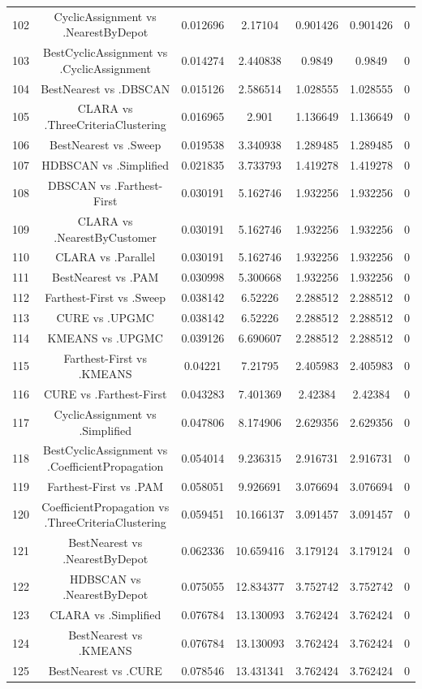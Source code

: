 \documentclass[a4paper,10pt]{article}
\begin{document}
\begin{landscape}
\begin{table}[!htp]
\begin{tabular}{ccccccc}
102&CyclicAssignment vs .NearestByDepot&0.012696&2.17104&0.901426&0.901426&0\\
103&BestCyclicAssignment vs .CyclicAssignment&0.014274&2.440838&0.9849&0.9849&0\\
104&BestNearest vs .DBSCAN&0.015126&2.586514&1.028555&1.028555&0\\
105&CLARA vs .ThreeCriteriaClustering&0.016965&2.901&1.136649&1.136649&0\\
106&BestNearest vs .Sweep&0.019538&3.340938&1.289485&1.289485&0\\
107&HDBSCAN vs .Simplified&0.021835&3.733793&1.419278&1.419278&0\\
108&DBSCAN vs .Farthest-First&0.030191&5.162746&1.932256&1.932256&0\\
109&CLARA vs .NearestByCustomer&0.030191&5.162746&1.932256&1.932256&0\\
110&CLARA vs .Parallel&0.030191&5.162746&1.932256&1.932256&0\\
111&BestNearest vs .PAM&0.030998&5.300668&1.932256&1.932256&0\\
112&Farthest-First vs .Sweep&0.038142&6.52226&2.288512&2.288512&0\\
113&CURE vs .UPGMC&0.038142&6.52226&2.288512&2.288512&0\\
114&KMEANS vs .UPGMC&0.039126&6.690607&2.288512&2.288512&0\\
115&Farthest-First vs .KMEANS&0.04221&7.21795&2.405983&2.405983&0\\
116&CURE vs .Farthest-First&0.043283&7.401369&2.42384&2.42384&0\\
117&CyclicAssignment vs .Simplified&0.047806&8.174906&2.629356&2.629356&0\\
118&BestCyclicAssignment vs .CoefficientPropagation&0.054014&9.236315&2.916731&2.916731&0\\
119&Farthest-First vs .PAM&0.058051&9.926691&3.076694&3.076694&0\\
120&CoefficientPropagation vs .ThreeCriteriaClustering&0.059451&10.166137&3.091457&3.091457&0\\
121&BestNearest vs .NearestByDepot&0.062336&10.659416&3.179124&3.179124&0\\
122&HDBSCAN vs .NearestByDepot&0.075055&12.834377&3.752742&3.752742&0\\
123&CLARA vs .Simplified&0.076784&13.130093&3.762424&3.762424&0\\
124&BestNearest vs .KMEANS&0.076784&13.130093&3.762424&3.762424&0\\
125&BestNearest vs .CURE&0.078546&13.431341&3.762424&3.762424&0\\

\end{tabular}
\end{table}
\end{landscape}
\end{document}
